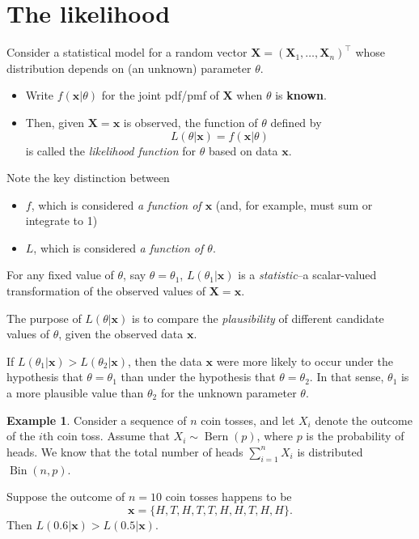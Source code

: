 \documentclass[
]{book}
\providecommand{\tightlist}{%
  \setlength{\itemsep}{0pt}\setlength{\parskip}{0pt}}
\newcommand{\bx}{{\boldsymbol x}}
\newcommand{\bX}{{\boldsymbol X}}
\DeclareMathOperator{\Bin}{Bin}
\DeclareMathOperator{\Bern}{Bern}
\theoremstyle{definition}
\theoremstyle{definition}
\newtheorem{example}{Example}[chapter]
\theoremstyle{definition}
\theoremstyle{definition}
\theoremstyle{remark}
\begin{document}
\hypertarget{the-likelihood}{%
\section{The likelihood}\label{the-likelihood}}

Consider a statistical model for a random vector \(\bX = (\bX_1,\dots,\bX_n)^\top\) whose distribution depends on (an unknown) parameter \(\theta\).

\begin{itemize}
\tightlist
\item
  Write \(f(\bx|\theta)\) for the joint pdf/pmf of \(\bX\) when \(\theta\) is \textbf{known}.
\item
  Then, given \(\bX=\bx\) is observed, the function of \(\theta\) defined by
  \[
  L(\theta|\bx) = f(\bx|\theta)
  \]
  is called the \emph{likelihood function} for \(\theta\) based on data \(\bx\).
\end{itemize}

Note the key distinction between

\begin{itemize}
\tightlist
\item
  \(f\), which is considered \emph{a function of \(\bx\)} (and, for example, must sum or integrate to 1)
\item
  \(L\), which is considered \emph{a function of \(\theta\)}.
\end{itemize}

For any fixed value of \(\theta\), say \(\theta=\theta_1\), \(L(\theta_1|\bx)\) is a \emph{statistic}--a scalar-valued transformation of the observed values of \(\bX=\bx\).

The purpose of \(L(\theta|\bx)\) is to compare the \emph{plausibility} of different candidate values of \(\theta\), given the observed data \(\bx\).

If \(L(\theta_1|\bx) > L(\theta_2|\bx)\), then the data \(\bx\) were more likely to occur under the hypothesis that \(\theta=\theta_1\) than under the hypothesis that \(\theta=\theta_2\). In that sense, \(\theta_1\) is a more plausible value than \(\theta_2\) for the unknown parameter \(\theta\).

\begin{example}
Consider a sequence of \(n\) coin tosses, and let \(X_i\) denote the outcome of the \(i\)th coin toss. Assume that \(X_i\sim\Bern(p)\), where \(p\) is the probability of heads. We know that the total number of heads \(\sum_{i=1}^n X_i\) is distributed \(\Bin(n,p)\).

Suppose the outcome of \(n=10\) coin tosses happens to be
\[\bx = \{H, T, H, T, T, H, H, T, H, H \}.\]
Then \(L(0.6|\bx) > L(0.5|\bx)\).
\end{example}
\end{document}
